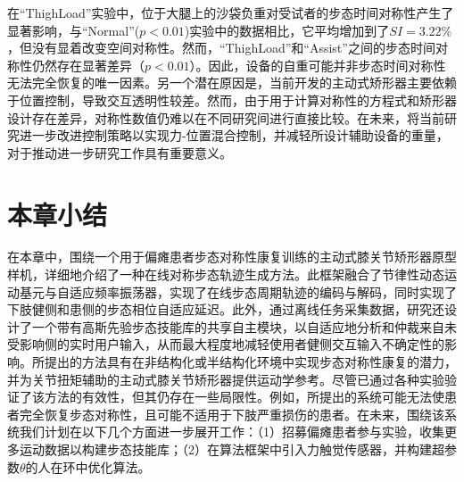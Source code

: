 在``ThighLoad''实验中，位于大腿上的沙袋负重对受试者的步态时间对称性产生了显著影响，与``Normal''($p<0.01$)实验中的数据相比，它平均增加到了${SI}=3.22 \%$，但没有显着改变空间对称性。然而，``ThighLoad''和``Assist''之间的步态时间对称性仍然存在显著差异（$p<0.01$）。因此，设备的自重可能并非步态时间对称性无法完全恢复的唯一因素。另一个潜在原因是，当前开发的主动式矫形器主要依赖于位置控制，导致交互透明性较差。然而，由于用于计算对称性的方程式和矫形器设计存在差异，对称性数值仍难以在不同研究间进行直接比较。在未来，将当前研究进一步改进控制策略以实现力-位置混合控制，并减轻所设计辅助设备的重量，对于推动进一步研究工作具有重要意义。


\section{本章小结}
在本章中，围绕一个用于偏瘫患者步态对称性康复训练的主动式膝关节矫形器原型样机，详细地介绍了一种在线对称步态轨迹生成方法。此框架融合了节律性动态运动基元与自适应频率振荡器，实现了在线步态周期轨迹的编码与解码，同时实现了下肢健侧和患侧的步态相位自适应延迟。此外，通过离线任务采集数据，研究还设计了一个带有高斯先验步态技能库的共享自主模块，以自适应地分析和仲裁来自未受影响侧的实时用户输入，从而最大程度地减轻使用者健侧交互输入不确定性的影响。所提出的方法具有在非结构化或半结构化环境中实现步态对称性康复的潜力，并为关节扭矩辅助的主动式膝关节矫形器提供运动学参考。尽管已通过各种实验验证了该方法的有效性，但其仍存在一些局限性。例如，所提出的系统可能无法使患者完全恢复步态对称性，且可能不适用于下肢严重损伤的患者。在未来，围绕该系统我们计划在以下几个方面进一步展开工作：（1）招募偏瘫患者参与实验，收集更多运动数据以构建步态技能库；（2）在算法框架中引入力触觉传感器，并构建超参数$\theta$的人在环中优化算法。